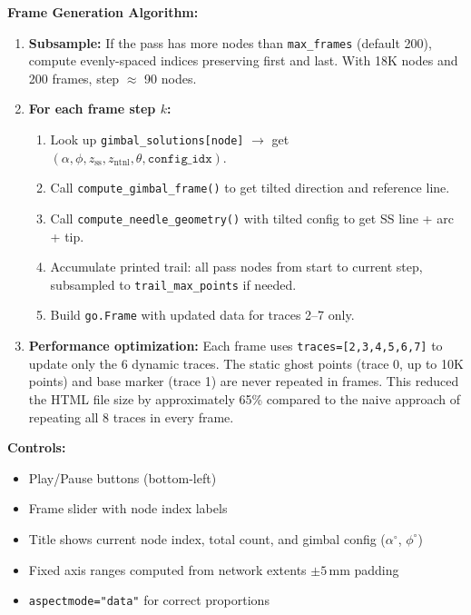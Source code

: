 \documentclass[11pt,a4paper]{article}
\newcommand{\funcname}[1]{\texttt{\textcolor{codepurple}{#1}}}
\newcommand{\param}[1]{\texttt{\textcolor{codegreen}{#1}}}
\begin{document}
\textbf{Frame Generation Algorithm:}
\begin{enumerate}[nosep]
    \item \textbf{Subsample:} If the pass has more nodes than \param{max\_frames} (default 200), compute evenly-spaced indices preserving first and last. With 18K nodes and 200 frames, step $\approx$ 90 nodes.

    \item \textbf{For each frame step $k$:}
    \begin{enumerate}[nosep,label=(\alph*)]
        \item Look up \texttt{gimbal\_solutions[node]} $\to$ get $(\alpha, \phi, z_\text{ss}, z_\text{ntnl}, \theta, \texttt{config\_idx})$.
        \item Call \funcname{compute\_gimbal\_frame()} to get tilted direction and reference line.
        \item Call \funcname{compute\_needle\_geometry()} with tilted config to get SS line + arc + tip.
        \item Accumulate printed trail: all pass nodes from start to current step, subsampled to \param{trail\_max\_points} if needed.
        \item Build \texttt{go.Frame} with updated data for traces 2--7 only.
    \end{enumerate}

    \item \textbf{Performance optimization:} Each frame uses \texttt{traces=[2,3,4,5,6,7]} to update only the 6 dynamic traces. The static ghost points (trace 0, up to 10K points) and base marker (trace 1) are never repeated in frames. This reduced the HTML file size by approximately 65\% compared to the naive approach of repeating all 8 traces in every frame.
\end{enumerate}

\textbf{Controls:}
\begin{itemize}[nosep]
    \item Play/Pause buttons (bottom-left)
    \item Frame slider with node index labels
    \item Title shows current node index, total count, and gimbal config ($\alpha^\circ$, $\phi^\circ$)
    \item Fixed axis ranges computed from network extents $\pm 5$\,mm padding
    \item \texttt{aspectmode="data"} for correct proportions
\end{itemize}
\end{document}
